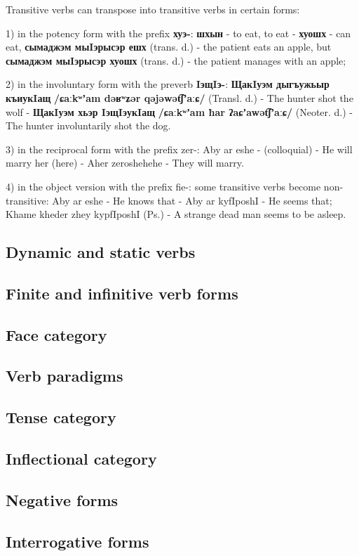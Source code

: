 \documentclass[a4paper,12pt]{book}
\newcommand{\1}[1]{\textbf{\emph{#1}}} %
\newcommand{\2}[1]{\textbf{[#1]}} %
\newcommand{\3}[1]{\fontsize{11pt}{0cm}\textbf{\emph{#1}}} %
\newcommand{\4}[1]{\fontsize{10pt}{0cm}\emph{#1}}	%
\newcommand{\5}[1]{\textbf{/#1/}} %
\newcommand{\6}[1]{\textbf{[#1]}} %
\newcommand{\7}[1]{\fontsize{12pt}{0cm}\emph{#1}} %
\newcommand{\8}[1]{\fontsize{12pt}{0cm}`#1'} %
\newcommand{\9}[1]{\fontsize{12pt}{0cm}(lit. `#1')} %
\newcommand{\glossphonemics}[1]{\textbf{/#1/}} %
\begin{document}
Transitive verbs can transpose into transitive verbs in certain forms:

1) in the potency form with the prefix \textbf{хуэ-}: \textbf{шхын} - to eat, to eat - \textbf{хуошх} - can eat, \textbf{сымаджэм мыIэрысэр ешх} (trans. d.) - the patient eats an apple, but \textbf{сымаджэм мыIэрысэр хуошх} (trans. d.) - the patient manages with an apple;

2) in the involuntary form with the preverb \textbf{IэщIэ-}: \textbf{ЩакIуэм дыгъужьыр къиукIащ} \glossphonemics{ɕaːkʷʼam dəʁʷʑər qəjəwət͡ʃʼaːɕ} (Transl. d.) - The hunter shot the wolf - \textbf{ЩакIуэм хьэр IэщIэукIащ} \glossphonemics{ɕaːkʷʼam ħar ʔaɕʼawət͡ʃʼaːɕ} (Neoter. d.) - The hunter involuntarily shot the dog.

3) in the reciprocal form with the prefix zer-: Aby ar eshe - (colloquial) - He will marry her (here) - Aher zeroshehehe - They will marry.

4) in the object version with the prefix fie-: some transitive verbs become non-transitive: Aby ar eshe - He knows that - Aby ar kyfIposhI - He seems that; Khame kheder zhey kypfIposhI (Ps.) - A strange dead man seems to be asleep.
\subsection{Dynamic and static verbs}
\subsection{Finite and infinitive verb forms}
\subsection{Face category}
\subsection{Verb paradigms}
\subsection{Tense category}
\subsection{Inflectional category}
\subsection{Negative forms}
\subsection{Interrogative forms}
\end{document}
